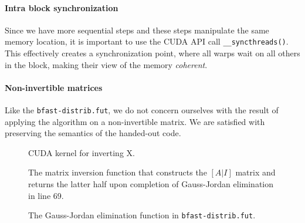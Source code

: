 \paragraph{Intra block synchronization}
Since we have more sequential steps and these steps manipulate the same memory
location, it is important to use the CUDA API call \texttt{\_\_syncthreads()}.
This effectively creates a synchronization point, where all warps wait on all
others in the block, making their view of the memory \textit{coherent}.

\paragraph{Non-invertible matrices}
Like the \texttt{bfast-distrib.fut}, we do not concern ourselves with the
result of applying the algorithm on a non-invertible matrix. We are satisfied
with preserving the semantics of the handed-out code.


\begin{figure}[H]
    \centering
    \caption{CUDA kernel for inverting X.}
    \label{cuda:kernel3}
\end{figure}


\begin{figure}[H]
    \centering
    \caption{The matrix inversion function that constructs the \([A|I]\) matrix
    and returns the latter half upon completion of Gauss-Jordan elimination in
line 69.}
    \label{fut:matinv}
\end{figure}

\begin{figure}[H]
    \centering
    \caption{The Gauss-Jordan elimination function in \texttt{bfast-distrib.fut}.}
    \label{fut:gaussjordan}
\end{figure}





